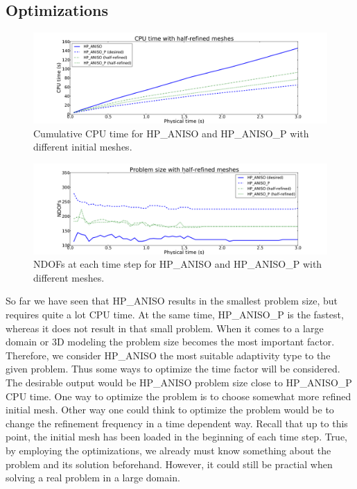 \subsection{Optimizations}

\begin{figure}
  \begin{centering}
  \includegraphics[width=\columnwidth]{refined_cpu}
  \caption{\label{fig:refined-cpu} Cumulative CPU time for HP\_ANISO and HP\_ANISO\_P
  with different initial meshes.}
  \end{centering}
\end{figure}

\begin{figure}
  \begin{centering}
  \includegraphics[width=\columnwidth]{refined_dof}
  \caption{\label{fig:refined-dof} NDOFs at each time step for
  HP\_ANISO and HP\_ANISO\_P with different meshes.}
  \end{centering}
\end{figure}

So far we have seen that HP\_ANISO results in the smallest problem size, but requires
quite a lot CPU time. At the same time, HP\_ANISO\_P is the fastest, whereas
it does not result in that small problem. When it comes to a large domain 
or 3D modeling the problem
size becomes the most important factor. Therefore, we consider HP\_ANISO the most
suitable adaptivity type to the given problem. Thus some ways to optimize the time
factor will be considered. The desirable output would be HP\_ANISO problem size
close to HP\_ANISO\_P CPU time. One way to optimize the problem
is to choose somewhat more refined initial mesh. Other way one could think
to optimize the problem would be to change
the refinement frequency in a time dependent way. Recall that up to this point,
the initial mesh has been loaded in the beginning of each time step. True,
by employing the optimizations, we already must know something about the problem
and its solution beforehand. However, it could still be practial when solving a real problem
in a large domain.

